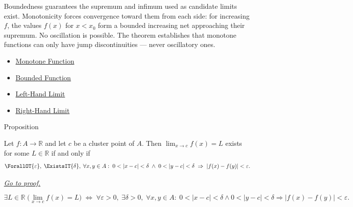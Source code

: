 \begin{remark*}[Interpretation]
Boundedness guarantees the supremum and infimum used as candidate
limits exist. Monotonicity forces convergence toward them from each
side: for increasing $f$, the values $f(x)$ for $x < x_0$ form a
bounded increasing net approaching their supremum. No oscillation is
possible. The theorem establishes that monotone functions can only
have jump discontinuities --- never oscillatory ones.
\end{remark*}

\begin{dependencies}
\begin{itemize}
  \item \hyperref[def:function-monotone]{Monotone Function}
  \item \hyperref[def:function-bounded]{Bounded Function}
  \item \hyperref[def:left-hand-limit]{Left-Hand Limit}
  \item \hyperref[def:right-hand-limit]{Right-Hand Limit}
\end{itemize}
\end{dependencies}


\begin{propositionbox}{Proposition}
\begin{proposition}
\label{prop:cauchy-criterion-limits}
Let $f : A \to \mathbb{R}$ and let $c$ be a cluster point of $A$.
Then $\lim_{x\to c}f(x)=L$ exists for some
$L \in \mathbb{R}$ if and only if
\[
  \ForallOT{\varepsilon},\;
  \ExistsIT{\delta},\;
  \forall x, y \in A :\;
  0<|x-c|<\delta
  \;\wedge\;
  0<|y-c|<\delta
  \;\Rightarrow\;
  |f(x)-f(y)|<\varepsilon.
\]

\smallskip\noindent
\hyperref[prf:cauchy-criterion-limits]{\textit{Go to proof.}}
\end{proposition}
\end{propositionbox}

\begin{remark*}
\[
  \exists L \in \mathbb{R}\;\bigl(\lim_{x\to c}f(x)=L\bigr)
  \;\iff\;
  \forall\varepsilon>0,\;\exists\delta>0,\;
  \forall x,y \in A :\;
  0<|x-c|<\delta \wedge 0<|y-c|<\delta
  \Rightarrow |f(x)-f(y)|<\varepsilon.
\]
\end{remark*}

